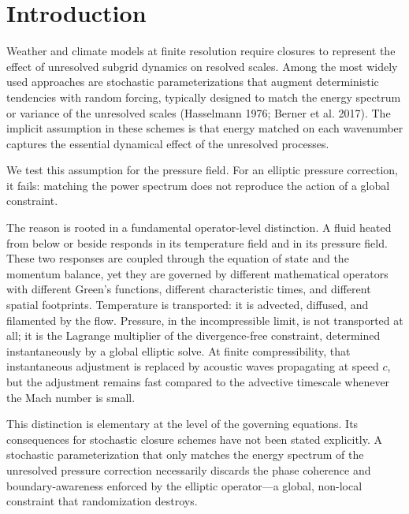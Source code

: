 \documentclass[11pt]{article}
\begin{document}
\section{Introduction}

Weather and climate models at finite resolution require closures to represent the effect of unresolved subgrid dynamics on resolved scales. Among the most widely used approaches are stochastic parameterizations that augment deterministic tendencies with random forcing, typically designed to match the energy spectrum or variance of the unresolved scales (Hasselmann 1976; Berner et al. 2017). The implicit assumption in these schemes is that energy matched on each wavenumber captures the essential dynamical effect of the unresolved processes.

We test this assumption for the pressure field. For an elliptic pressure correction, it fails: matching the power spectrum does not reproduce the action of a global constraint.

The reason is rooted in a fundamental operator-level distinction. A fluid heated from below or beside responds in its temperature field and in its pressure field. These two responses are coupled through the equation of state and the momentum balance, yet they are governed by different mathematical operators with different Green's functions, different characteristic times, and different spatial footprints. Temperature is transported: it is advected, diffused, and filamented by the flow. Pressure, in the incompressible limit, is not transported at all; it is the Lagrange multiplier of the divergence-free constraint, determined instantaneously by a global elliptic solve. At finite compressibility, that instantaneous adjustment is replaced by acoustic waves propagating at speed $c$, but the adjustment remains fast compared to the advective timescale whenever the Mach number is small.

This distinction is elementary at the level of the governing equations. Its consequences for stochastic closure schemes have not been stated explicitly. A stochastic parameterization that only matches the energy spectrum of the unresolved pressure correction necessarily discards the phase coherence and boundary-awareness enforced by the elliptic operator---a global, non-local constraint that randomization destroys.
\end{document}
